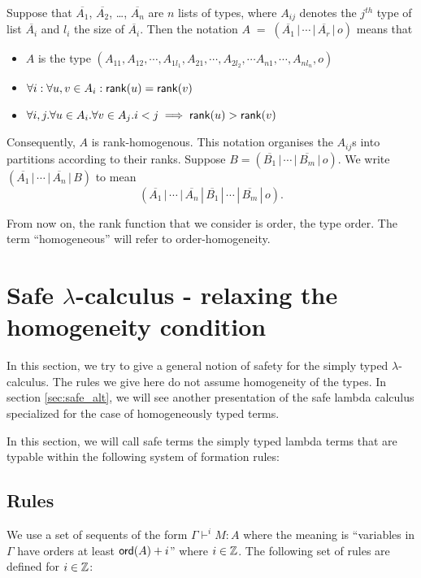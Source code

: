 Suppose that $\overline{A_1}$, $\overline{A_2}$, \ldots,
$\overline{A_n}$ are $n$ lists of types, where $A_{ij}$ denotes the
$j^{th}$ type of list $\overline{A_i}$ and $l_i$ the size of
$\overline{A_i}$. Then the notation $A \; = \; (\overline{A_1} \, |
\, \cdots \, | \, \overline{A_r} \, | \, o)$ means that
\begin{itemize}
  \item $A$ is the type $(A_{11},A_{12},\cdots, A_{1l_1}, A_{21}, \cdots,A_{2l_2}, \cdots A_{n1},\cdots, A_{nl_n},o)$
  \item $\forall i: \forall u,v \in A_i : {\sf rank}(u) = {\sf rank}(v) $
  \item $\forall i,j . \forall u \in A_i . \forall v \in A_j . i<j \implies {\sf rank}(u) >
   {\sf rank}(v) $
\end{itemize}
Consequently, $A$ is rank-homogenous. This notation organises the
$A_{ij}$s into partitions according to their ranks. Suppose $B =
(\overline{B_1} \, | \, \cdots \, | \, \overline{B_m} \, | \, o)$.
We write $(\overline{A_1} \, | \, \cdots \, | \, \overline{A_n} \, |
\, {B})$ to mean
\[(\overline{A_1} \, | \, \cdots \, | \, \overline{A_n} \, | \,
\overline{B_1} \, | \, \cdots \, | \, \overline{B_m} \, | \, o).\]

From now on, the rank function that we consider is {\sf order}, the type order. The term ``homogeneous'' will refer to order-homogeneity.



\section{Safe $\lambda$-calculus - relaxing the homogeneity condition}

In this section, we try to give a general notion of safety for the simply typed $\lambda$-calculus.
The rules we give here do not assume homogeneity of the types.
In section \ref{sec:safe_alt}, we will see another presentation of the safe lambda calculus specialized
for the case of homogeneously typed terms.

In this section, we will call safe terms the simply typed lambda terms
that are typable within the following system of formation rules:

\subsection{ Rules}

 We use a set of sequents of the form $\Gamma \vdash^{i} M :
A$ where the meaning is ``variables in $\Gamma$ have orders at least
${\sf ord}(A)+i$'' where $i \in \mathbb{Z}$. The following set of rules are
defined for $i \in \mathbb{Z}$:

